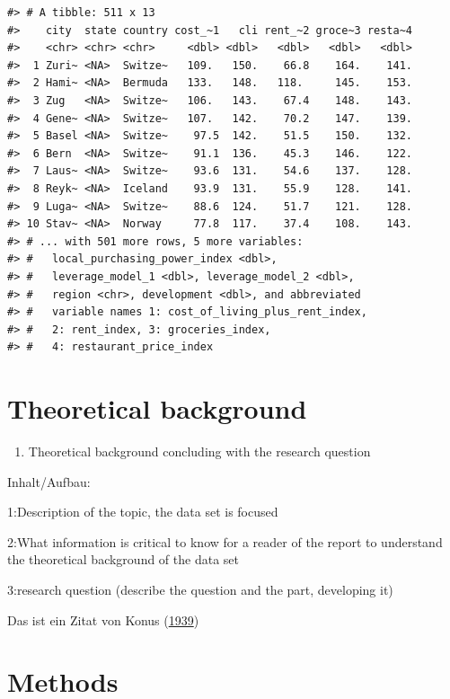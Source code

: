 \documentclass[
  11pt,
  a4paper,
  twoside]{scrbook}
\providecommand{\tightlist}{%
  \setlength{\itemsep}{0pt}\setlength{\parskip}{0pt}}
\begin{document}
\linespread{1}

\begin{verbatim}
#> # A tibble: 511 x 13
#>    city  state country cost_~1   cli rent_~2 groce~3 resta~4
#>    <chr> <chr> <chr>     <dbl> <dbl>   <dbl>   <dbl>   <dbl>
#>  1 Zuri~ <NA>  Switze~   109.   150.    66.8    164.    141.
#>  2 Hami~ <NA>  Bermuda   133.   148.   118.     145.    153.
#>  3 Zug   <NA>  Switze~   106.   143.    67.4    148.    143.
#>  4 Gene~ <NA>  Switze~   107.   142.    70.2    147.    139.
#>  5 Basel <NA>  Switze~    97.5  142.    51.5    150.    132.
#>  6 Bern  <NA>  Switze~    91.1  136.    45.3    146.    122.
#>  7 Laus~ <NA>  Switze~    93.6  131.    54.6    137.    128.
#>  8 Reyk~ <NA>  Iceland    93.9  131.    55.9    128.    141.
#>  9 Luga~ <NA>  Switze~    88.6  124.    51.7    121.    128.
#> 10 Stav~ <NA>  Norway     77.8  117.    37.4    108.    143.
#> # ... with 501 more rows, 5 more variables:
#> #   local_purchasing_power_index <dbl>,
#> #   leverage_model_1 <dbl>, leverage_model_2 <dbl>,
#> #   region <chr>, development <dbl>, and abbreviated
#> #   variable names 1: cost_of_living_plus_rent_index,
#> #   2: rent_index, 3: groceries_index,
#> #   4: restaurant_price_index
\end{verbatim}

\hypertarget{theoretical-background}{%
\chapter{Theoretical background}\label{theoretical-background}}

\begin{enumerate}
\def\labelenumi{\arabic{enumi}.}
\setcounter{enumi}{1}
\tightlist
\item
  Theoretical background concluding with the research question
\end{enumerate}

Inhalt/Aufbau:

1:Description of the topic, the data set is focused

2:What information is critical to know for a reader of the report to understand the theoretical background of the data set

3:research question (describe the question and the part, developing it)

Das ist ein Zitat von Konus (\protect\hyperlink{ref-Konus1939}{1939})

\hypertarget{methods}{%
\chapter{Methods}\label{methods}}
\end{document}
